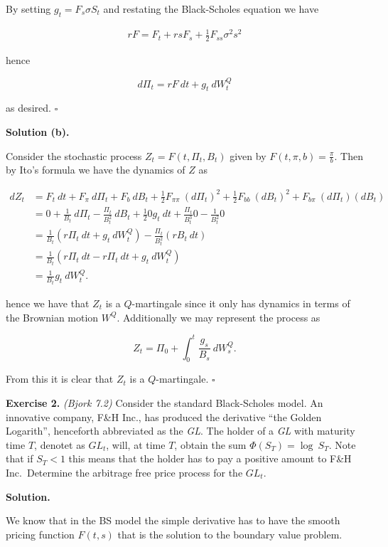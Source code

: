 \documentclass[
]{article}
\begin{document}
By setting \(g_t=F_s\sigma S_t\) and restating the Black-Scholes
equation we have

\begin{align*}
rF=F_t+rsF_s+\frac{1}{2}F_{ss}\sigma ^2 s^2
\end{align*}

hence

\[
d\Pi_t=r F\ dt+g_t\ dW^Q_t
\]

as desired. \(\square\)

\textbf{Solution (b).}

Consider the stochastic process \(Z_t=F(t,\Pi_t,B_t)\) given by
\(F(t,\pi,b)=\frac{\pi}{b}\). Then by Ito's formula we have the dynamics
of \(Z\) as

\begin{align*}
dZ_t&=F_t\ dt+F_\pi\ d\Pi_t+F_b\ dB_t+\frac{1}{2}F_{\pi\pi}\ (d\Pi_t)^2+\frac{1}{2}F_{bb}\ (dB_t)^2+F_{b\pi}\ (d\Pi_t)(dB_t)\\
&=0+\frac{1}{B_t}\ d\Pi_t-\frac{\Pi_t}{B_t^2}\ dB_t+\frac{1}{2}0g_t\ dt+\frac{\Pi_t}{B_t^3}0-\frac{1}{B_t^2}0\\
&=\frac{1}{B_t}(r \Pi_t\ dt + g_t\ dW^Q_t)-\frac{\Pi_t}{B_t^2}(rB_t\ dt)\\
&=\frac{1}{B_t}(r\Pi_t\ dt-r\Pi_t\ dt+g_t\ dW_t^Q)\\
&=\frac{1}{B_t}g_t\ dW_t^Q.
\end{align*}

hence we have that \(Z_t\) is a \(Q\)-martingale since it only has
dynamics in terms of the Brownian motion \(W^Q\). Additionally we may
represent the process as

\[
Z_t=\Pi_0+\int_0^t\frac{g_s}{B_s}\ dW_s^Q.
\]

From this it is clear that \(Z_t\) is a \(Q\)-martingale. \(\square\)

\textbf{Exercise 2.} \emph{(Bjork 7.2)} Consider the standard
Black-Scholes model. An innovative company, F\&H Inc., has produced the
derivative ``the Golden Logarith'', henceforth abbreviated as the
\emph{GL}. The holder of a \emph{GL} with maturity time \(T\), denotet
as \(GL_t\), will, at time \(T\), obtain the sum
\(\Phi(S_T)=\log\ S_T\). Note that if \(S_T<1\) this means that the
holder has to pay a positive amount to F\&H Inc.~Determine the arbitrage
free price process for the \(GL_t\).

\textbf{Solution.}

We know that in the BS model the simple derivative has to have the
smooth pricing function \(F(t,s)\) that is the solution to the boundary
value problem.
\end{document}
